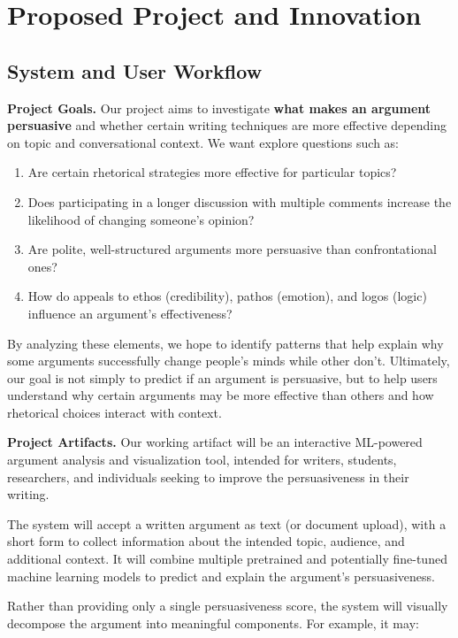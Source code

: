 
\section{Proposed Project and Innovation}
\subsection*{System and User Workflow}

\textbf{Project Goals.} Our project aims to investigate \textbf{what makes an argument persuasive} and whether certain writing techniques are more effective depending on topic and conversational context. We want explore questions such as: 

\begin{enumerate}
    \item Are certain rhetorical strategies more effective for particular topics?
    \item Does participating in a longer discussion with multiple comments increase the likelihood of changing someone's opinion?
    \item Are polite, well-structured arguments more persuasive than confrontational ones? 
    \item How do appeals to ethos (credibility), pathos (emotion), and logos (logic) influence an argument's effectiveness?
\end{enumerate}

By analyzing these elements, we hope to identify patterns that help explain why some arguments successfully change people's minds while other don't. Ultimately, our goal is not simply to predict if an argument is persuasive, but to help users understand why certain arguments may be more effective than others and how rhetorical choices interact with context.

\textbf{Project Artifacts.} Our working artifact will be an interactive ML-powered argument analysis and visualization tool, intended for writers, students, researchers, and individuals seeking to improve the persuasiveness in their writing. 

The system will accept a written argument as text (or document upload), with a short form to collect information about the intended topic, audience, and additional context. It will combine multiple pretrained and potentially fine-tuned machine learning models to predict and explain the argument's persuasiveness. 

Rather than providing only a single persuasiveness score, the system will visually decompose the argument into meaningful components. For example, it may: 

